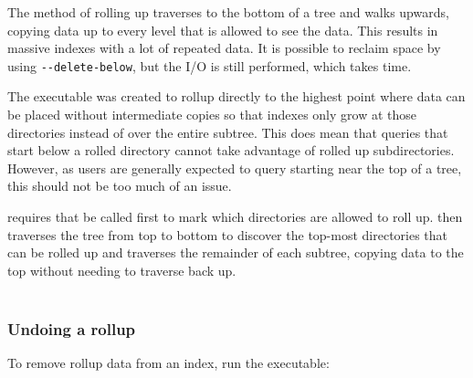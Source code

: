 \subsubsection{\gufirolluptopdown}
The \gufirollup method of rolling up traverses to the bottom of a tree
and walks upwards, copying data up to every level that is allowed to
see the data. This results in massive indexes with a lot of repeated
data. It is possible to reclaim space by using
\texttt{-{}-delete-below}, but the I/O is still performed, which takes
time.

The \gufirolluptopdown executable was created to rollup directly to
the highest point where data can be placed without intermediate copies
so that indexes only grow at those directories instead of over the
entire subtree. This does mean that queries that start below a rolled
directory cannot take advantage of rolled up subdirectories. However,
as users are generally expected to query starting near the top of a
tree, this should not be too much of an issue.

\gufirolluptopdown requires that \gufitreesummaryall be called first
to mark which directories are allowed to roll up. \gufirolluptopdown
then traverses the tree from top to bottom to discover the top-most
directories that can be rolled up and traverses the remainder of each
subtree, copying data to the top without needing to traverse back up.
\\\\
\indent \gufitreesummaryall \indexroot

\indent \gufirolluptopdown \indexroot

\subsubsection{Undoing a rollup}
To remove rollup data from an index, run the \gufiunrollup executable:
\\\\
\indent \gufiunrollup \indexroot
\newpage

